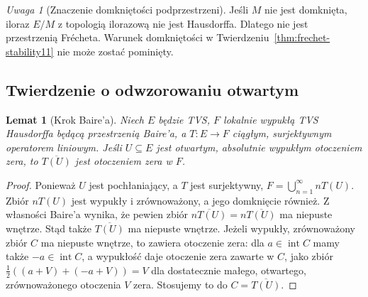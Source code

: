 \documentclass[11pt,a4paper]{article}
\numberwithin{equation}{section}
\theoremstyle{plain}
\newtheorem{lemat}[twierdzenie]{Lemat}
\theoremstyle{definition}
\theoremstyle{remark}
\newtheorem{uwaga}[twierdzenie]{Uwaga}
\begin{document}
\begin{uwaga}[Znaczenie domkniętości podprzestrzeni]
Jeśli $M$ nie jest domknięta, iloraz $E/M$ z topologią
ilorazową nie jest Hausdorffa. Dlatego nie jest przestrzenią
Frécheta. Warunek domkniętości w Twierdzeniu~\ref{thm:frechet-stability11}
nie może zostać pominięty.
\end{uwaga}

\subsection{Twierdzenie o odwzorowaniu otwartym}

\begin{lemat}[Krok Baire'a]\label{lem:baire-open11}
Niech $E$ będzie TVS, $F$ lokalnie wypukłą TVS Hausdorffa
będącą przestrzenią Baire'a, a $T:E\to F$ ciągłym,
surjektywnym operatorem liniowym. Jeśli $U\subseteq E$
jest otwartym, absolutnie wypukłym otoczeniem zera, to
$\overline{T(U)}$ jest otoczeniem zera w $F$.
\end{lemat}
\begin{proof}
Ponieważ $U$ jest pochłaniający, a $T$ jest surjektywny,
$F=\bigcup_{n=1}^\infty nT(U)$. Zbiór $nT(U)$ jest
wypukły i zrównoważony, a jego domknięcie również.
Z własności Baire'a wynika, że pewien zbiór
$\overline{nT(U)}=n\overline{T(U)}$ ma niepuste wnętrze.
Stąd także $\overline{T(U)}$ ma niepuste wnętrze.
Jeżeli wypukły, zrównoważony zbiór $C$ ma niepuste wnętrze,
to zawiera otoczenie zera: dla $a\in\operatorname{int}C$
mamy także $-a\in\operatorname{int}C$, a wypukłość
daje otoczenie zera zawarte w $C$, jako zbiór
$\tfrac12((a+V)+(-a+V))=V$ dla dostatecznie małego,
otwartego, zrównoważonego otoczenia $V$ zera.
Stosujemy to do $C=\overline{T(U)}$.
\end{proof}
\end{document}
